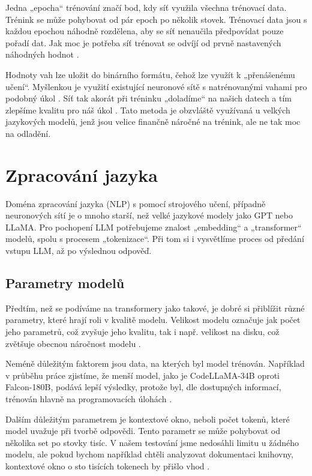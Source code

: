 \documentclass[FM,DP]{tulthesis}
\begin{document}
		Jedna „epocha“ trénování značí bod, kdy síť využila všechna trénovací data. Trénink se může pohybovat od pár epoch po několik stovek. Trénovací data jsou s každou epochou náhodně rozdělena, aby se síť nenaučila předpovídat pouze pořadí dat. Jak moc je potřeba síť trénovat se odvíjí od prvně nastavených náhodných hodnot \cite{tds_train}. 
		
		Hodnoty vah lze uložit do binárního formátu, čehož lze využít k „přenášenému učení“. Myšlenkou je využití existující neuronové sítě s natrénovanými vahami pro podobný úkol \cite{wiki:transfer}. Síť tak akorát při tréninku „doladíme“ na našich datech a tím zlepšíme kvalitu pro náš úkol \cite{hgf:finetune}. Tato metoda je obzvláště využívaná u velkých jazykových modelů, jenž jsou velice finančně náročné na trénink, ale ne tak moc na odladění.
		
		\chapter{Zpracování jazyka}
		Doména zpracování jazyka (NLP) s pomocí strojového učení, případně neuronových sítí je o mnoho starší, než velké jazykové modely jako GPT nebo LLaMA. Pro pochopení LLM potřebujeme znalost „embedding“ a „transformer“ modelů, spolu s procesem „tokenizace“. Při tom si i vysvětlíme proces od předání vstupu LLM, až po výslednou odpověď.
		
		\section{Parametry modelů}
		Předtím, než se podíváme na transformery jako takové, je dobré si přiblížit různé parametry, které hrají roli v kvalitě modelu. Velikost modelu označuje jak počet jeho parametrů, což zvyšuje jeho kvalitu, tak i např. velikost na disku, což zvětšuje obecnou náročnost modelu \cite{llm_parameters}. 
		
		Neméně důležitým faktorem jsou data, na kterých byl model trénován. Například v průběhu práce zjistíme, že menší model, jako je CodeLLaMA-34B oproti Falcon-180B, podává lepší výsledky, protože byl, dle dostupných informací, trénován hlavně na programovacích úlohách \cite{llm_parameters} \cite{falcon}.
		
		Dalším důležitým parametrem je kontextové okno, neboli počet tokenů, které model uvažuje při tvorbě odpovědi. Tento parametr se může pohybovat od několika set po stovky tisíc. V našem testování jsme nedosáhli limitu u žádného modelu, ale pokud bychom například chtěli analyzovat dokumentaci knihovny, kontextové okno o sto tisících tokenech by přišlo vhod \cite{llm_parameters}. 
		
\end{document}
